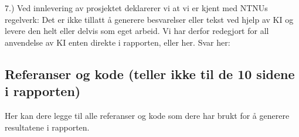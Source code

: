 \documentclass[]{article}
\begin{document}
7.) Ved innlevering av prosjektet deklarerer vi at vi er kjent med NTNUs
regelverk: Det er ikke tillatt å generere besvarelser eller tekst ved
hjelp av KI og levere den helt eller delvis som eget arbeid. Vi har
derfor redegjort for all anvendelse av KI enten direkte i rapporten,
eller her. Svar her:

\newpage

\subsection{Referanser og kode (teller ikke til de 10 sidene i
rapporten)}\label{referanser-og-kode-teller-ikke-til-de-10-sidene-i-rapporten}

Her kan dere legge til alle referanser og kode som dere har brukt for å
generere resultatene i rapporten.
\end{document}

